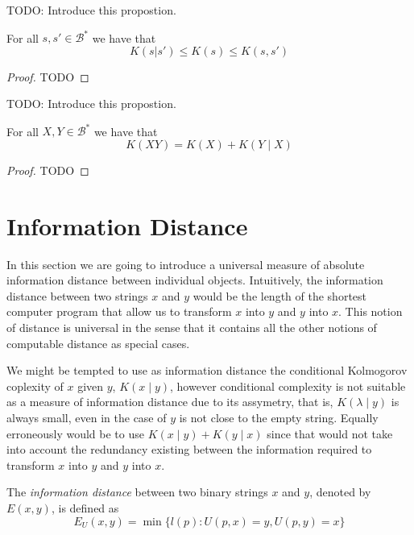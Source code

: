 {\color{red} TODO: Introduce this propostion.}

\begin{proposition}
\label{prop:kolmogorov_relations}
For all $s, s'\in\mathcal{B}^{\ast}$ we have that
\[
K(s | s' ) \leq K(s) \leq K(s, s')
\]
\end{proposition}
\begin{proof}
{\color{red} TODO}
\end{proof}

{\color{red} TODO: Introduce this propostion.}

\begin{proposition}
\label{prop:kolmogorov_relations}
For all $X, Y\in\mathcal{B}^{\ast}$ we have that
\[
K(XY) = K(X) + K(Y \mid X)
\]
\end{proposition}
\begin{proof}
{\color{red} TODO}
\end{proof}

%
%

\section{Information Distance}
\label{sec:information_distance}

In this section we are going to introduce a universal measure of absolute information distance between individual objects. Intuitively, the information distance between two strings $x$ and $y$ would be the length of the shortest computer program that allow us to transform $x$ into $y$ and $y$ into $x$. This notion of distance is universal in the sense that it contains all the other notions of computable distance as special cases.

We might be tempted to use as information distance the conditional Kolmogorov coplexity of $x$ given $y$, $K(x \mid y)$, however conditional complexity is not suitable as a measure of information distance due to its assymetry, that is, $K( \lambda \mid y)$ is always small, even in the case of $y$ is not close to the empty string. Equally erroneously would be to use $K(x \mid y) + K(y \mid x)$ since that would not take into account the redundancy existing between the information required to transform $x$ into $y$ and $y$ into $x$.

\begin{definition}
The \emph{information distance} between two binary strings $x$ and $y$, denoted by $E(x, y)$, is defined as
\[
E_U(x, y) = \min \{ l(p) : U(p, x) = y, U(p, y) = x \}
\]
\end{definition}

